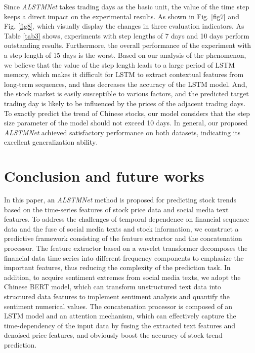 \documentclass[sn-mathphys]{sn-jnl}%
\theoremstyle{thmstyleone}%
\theoremstyle{thmstyletwo}%
\theoremstyle{thmstylethree}%
\begin{document}
Since {\it ALSTMNet} takes trading days as the basic unit, the value of the time step keeps a direct impact on the experimental results. As shown in Fig. \ref{fig7} and Fig. \ref{fig8}, which visually display the changes in three evaluation indicators. As Table \ref{tab3} shows, experiments with step lengths of 7 days and 10 days perform outstanding results. Furthermore, the overall performance of the experiment with a step length of 15 days is the worst. Based on our analysis of the phenomenon, we believe that the value of the step length leads to a large period of LSTM memory, which makes it difficult for LSTM to extract contextual features from long-term sequences, and thus decreases the accuracy of the LSTM model. And, the stock market is easily susceptible to various factors, and the predicted target trading day is likely to be influenced by the prices of the adjacent trading days. To exactly predict the trend of Chinese stocks, our model considers that the step size parameter of the model should not exceed 10 days. In general, our proposed {\it ALSTMNet} achieved satisfactory performance on both datasets, indicating its excellent generalization ability.

\section{Conclusion and future works}\label{Conclusion and future works}
In this paper, an {\it ALSTMNet} method is proposed for predicting stock trends based on the time-series features of stock price data and social media text features. To address the challenges of temporal dependence on financial sequence data and the fuse of social media texts and stock information, we construct a predictive framework consisting of the feature extractor and the concatenation processor. The feature extractor based on a wavelet transformer decomposes the financial data time series into different frequency components to emphasize the important features, thus reducing the complexity of the prediction task. In addition, to acquire sentiment extremes from social media texts, we adopt the Chinese BERT model, which can transform unstructured text data into structured data features to implement sentiment analysis and quantify the sentiment numerical values. The concatenation processor is composed of an LSTM model and an attention mechanism, which can effectively capture the time-dependency of the input data by fusing the extracted text features and denoised price features, and obviously boost the accuracy of stock trend prediction.
\end{document}
